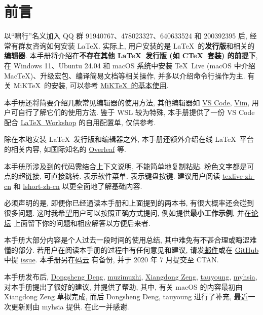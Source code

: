 
\chapter*{前言}

以``啸行''名义加入 QQ 群 91940767、478023327、640633524 和 200392395 后,
经常有群友咨询如何安装 \LaTeX.
实际上,
用户安装的是 \LaTeX\ 的\textbf{发行版}和相关的\textbf{编辑器}.
本手册将介绍在\textbf{不存在其他 \LaTeX\ 发行版 (如 C\TeX\ 套装) 的前提下},
在 Windows 11、Ubuntu 24.04 和 macOS 系统中安装
\TeX~Live (macOS 中介绍 Mac\TeX)、升级宏包、编译简易文档等相关操作,
并多以介绍命令行操作为主.
有关 MiK\TeX\ 的安装,
可以参考 \href{https://camusecao.top/2021-06-16/MiKTeX/}{MiK\TeX\ 的基本使用}.

本手册还将简要介绍几款常见编辑器的使用方法,
其他编辑器如 \href{https://code.visualstudio.com/}{VS Code},
\href{https://www.vim.org/}{Vim},
用户可自行了解它们的使用方法.
鉴于 WSL 较为特殊,
本手册提供了一份 VS Code 配合
\href{https://marketplace.visualstudio.com/items?itemName=James-Yu.latex-workshop}{\LaTeX\ Workshop}
的自用配置单,
仅供参考.

除在本地安装 \LaTeX\ 发行版和编辑器之外,
本手册还额外介绍在线 \LaTeX\ 平台的相关内容,
如国际知名的 \href{http://www.overleaf.com/}{Overleaf} 等.

本手册所涉及到的代码需结合上下文说明, 不能简单地复制粘贴.
粉色文字都是可点的超链接, 可直接跳转.
 表示软件菜单.  表示键盘按键.
建议用户阅读 \href{https://tug.org/texlive/doc/texlive-zh-cn/texlive-zh-cn.pdf}{\textsf{texlive-zh-cn}}
和 \href{http://mirrors.ctan.org/info/lshort/chinese/lshort-zh-cn.pdf}{\textsf{lshort-zh-cn}}
以更全面地了解基础内容.

必须声明的是,
即便你已经通读本手册和上面提到的两本书,
有很大概率还会碰到很多问题.
这时我希望用户可以按照正确方式提问,
例如提供\textbf{最小工作示例},
并在\href{https://ask.latexstudio.net/}{论坛}%
上面留下你的问题和相应解答以方便后来者.

本手册大部分内容是个人过去一段时间的使用总结, 其中难免有不甚合理或晦涩难懂的部分.
若用户在阅读本手册的过程中有任何意见和建议,
请发\href{mailto:ranwang.osbert@outlook.com}{邮件}或在
\href{https://github.com/OsbertWang/install-latex-guide-zh-cn}{GitHub} 中提
\href{https://github.com/OsbertWang/install-latex-guide-zh-cn/issues}{issue}.
本手册另在\href{https://gitee.com/OsbertWang/install-latex-guide-zh-cn}{码云}%
有备份,
并于 2020 年 7 月提交至 CTAN.

本手册发布后,
\href{https://github.com/EthanDeng}{Dongsheng Deng},
\href{https://github.com/muzimuzhi}{muzimuzhi},
\href{https://github.com/stone-zeng}{Xiangdong Zeng},
\href{https://github.com/taumasyang}{tauyoung},
\href{https://github.com/myhsia}{myhsia},
对本手册提出了很好的建议, 并提供了帮助,
其中, 有关 macOS 的内容最初由 Xiangdong Zeng 草拟完成,
而后 Dongsheng Deng, tauyoung 进行了补充,
最近一次更新则由 myhsia 提供.
在此一并感谢.

